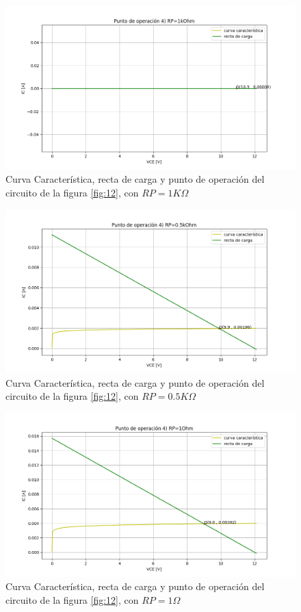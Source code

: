 \documentclass[10pt, a4paper]{article}
\begin{document}
    \newpage

    \begin{figure}[h!]
        \centering
        \includegraphics[height=5cm\textwidth]{4RP1K.png}
        \caption{Curva Característica, recta de carga y punto de operación del circuito de la figura \ref{fig:12}, con $RP = 1K\Omega$}
        \label{fig:4RP1K}
    \end{figure}

    \begin{figure}[h!]
        \centering
        \includegraphics[height=5cm\textwidth]{4RP05K.png}
        \caption{Curva Característica, recta de carga y punto de operación del circuito de la figura \ref{fig:12}, con $RP = 0.5K\Omega$}
        \label{fig:4RP05K}
    \end{figure}

    \begin{figure}[h!]
        \centering
        \includegraphics[height=5cm\textwidth]{4RP1.png}
        \caption{Curva Característica, recta de carga y punto de operación del circuito de la figura \ref{fig:12}, con $RP = 1\Omega$}
        \label{fig:4RP1}
    \end{figure}
\end{document}
